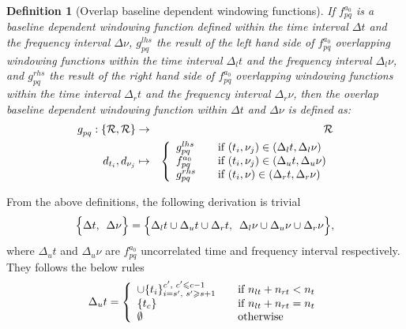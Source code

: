 \documentclass[useAMS,usenatbib]{mn2e}
\newtheorem{definition}[theorem]{Definition}
\begin{document}
\begin{definition}[Overlap baseline dependent windowing functions]
 \label{def:4}
If $f_{pq}^{a_0}$ is a baseline dependent windowing function defined within the time interval $\Delta t$ and the frequency interval 
$\Delta \nu$, $g^{lhs}_{pq}$ the result of the left hand side of $f_{pq}^{a_0}$ overlapping windowing functions within the time interval 
$\Delta_l t$ and the frequency interval $\Delta_l \nu$, and $g^{rhs}_{pq}$  the result of the right hand side of $f_{pq}^{a_0}$ overlapping 
windowing functions within the time interval $\Delta_r t$ and the frequency interval 
$\Delta_r \nu$, then the overlap baseline dependent windowing function within  $\Delta t$ and $\Delta \nu$ is defined as:
\begin{eqnarray*}
 g^{}_{pq}: \{\mathbf{\mathcal{R}},\mathbf{\mathcal{R}}\} &\rightarrow& \mathbf{\mathcal{R}}\\
                   d_{t_i},d_{\nu_j} &\mapsto&
 \left\{ 
  \begin{array}{l l}
    g^{lhs}_{pq} & \quad \text{if $(t_i,\nu_j) \in (\Delta_l t, \Delta_l \nu)$}\\
    f^{a_0}_{pq} & \quad \text{if $(t_i,\nu_j) \in (\Delta_u t, \Delta_u \nu)$}\\
    g^{rhs}_{pq}& \quad \text{if $(t_i,\nu) \in (\Delta_r t, \Delta_r \nu)$}
  \end{array} \right.
\end{eqnarray*}
\end{definition}
From the above definitions, the following derivation is trivial 
\begin{equation*}
 \Big\{\Delta t,\hspace{0.17cm}\Delta \nu \Big\}=\Big\{\Delta_l t \cup \Delta_u t \cup \Delta_r t, \hspace{0.17cm}\Delta_l \nu \cup 
\Delta_u \nu \cup \Delta_r \nu \Big\},
\end{equation*}
where $\Delta_u t$ and $\Delta_u \nu$ are $f_{pq}^{a_0}$ uncorrelated time  and frequency interval respectively. They follows the below 
rules 
\begin{eqnarray*}
 \Delta_u t= \left\{ 
  \begin{array}{l l}
     \cup\{t_i\}_{i=s',\hspace{0.1cm} s' \geq s+1}^{c', \hspace{0.1cm}c'\leq c-1} & \quad \text{if $n_{lt}+n_{rt}< n_t$}\\
      \{t_c\}& \quad \text{if $n_{lt}+n_{rt} = n_t$}\\
       \emptyset  & \quad \text{otherwise}
  \end{array} \right.
\end{eqnarray*}
\end{document}
